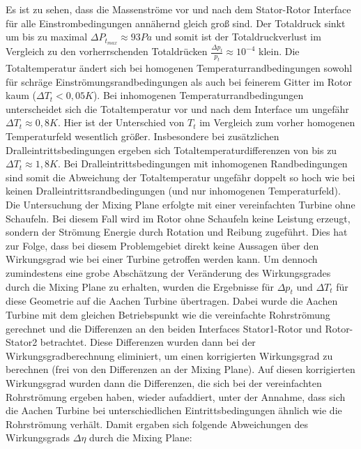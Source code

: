 Es ist zu sehen, dass die Massenströme vor und nach dem Stator-Rotor Interface für alle Einstrombedingungen annähernd gleich groß sind. Der Totaldruck sinkt um bis zu maximal $\Delta P_{t_{max}} \approx 93 Pa$ und somit ist der Totaldruckverlust im Vergleich zu den vorherrschenden Totaldrücken $\frac{\Delta p_t}{p_t} \approx 10^{-4}$ klein. \newline Die Totaltemperatur ändert sich bei homogenen Temperaturrandbedingungen sowohl für schräge Einströmungsrandbedingungen als auch bei feinerem Gitter im Rotor kaum ($\Delta T_t < 0,05 K$). \newline
Bei inhomogenen Temperaturrandbedingungen unterscheidet sich die Totaltemperatur vor und nach dem Interface um ungefähr $\Delta T_t \approx 0,8K$. Hier ist der Unterschied von $T_t$ im Vergleich zum vorher homogenen Temperaturfeld wesentlich größer. Insbesondere bei zusätzlichen Dralleintrittsbedingungen ergeben sich Totaltemperaturdifferenzen von bis zu $\Delta T_t \approx 1,8K$. Bei Dralleintrittsbedingungen mit inhomogenen Randbedingungen sind somit die Abweichung der Totaltemperatur ungefähr doppelt so hoch wie bei keinen Dralleintrittsrandbedingungen (und nur inhomogenen Temperaturfeld).\\
Die Untersuchung der Mixing Plane erfolgte mit einer vereinfachten Turbine ohne Schaufeln. Bei diesem Fall wird im Rotor ohne Schaufeln keine Leistung erzeugt, sondern der Strömung Energie durch Rotation und Reibung zugeführt. Dies hat zur Folge, dass bei diesem Problemgebiet direkt keine Aussagen über den Wirkungsgrad wie bei einer Turbine getroffen werden kann. Um dennoch zumindestens eine grobe Abschätzung der Veränderung des Wirkungsgrades durch die Mixing Plane zu erhalten, wurden die Ergebnisse für $\Delta p_t$ und $\Delta T_t$ für diese Geometrie auf die Aachen Turbine übertragen. Dabei wurde die Aachen Turbine mit dem gleichen Betriebspunkt wie die vereinfachte Rohrströmung gerechnet und die Differenzen an den beiden Interfaces Stator1-Rotor und Rotor-Stator2 betrachtet. Diese Differenzen wurden dann bei der Wirkungsgradberechnung eliminiert, um einen korrigierten Wirkungsgrad zu berechnen (frei von den Differenzen an der Mixing Plane). Auf diesen korrigierten Wirkungsgrad wurden dann die Differenzen, die sich bei der vereinfachten Rohrströmung ergeben haben, wieder aufaddiert, unter der Annahme, dass sich die Aachen Turbine bei unterschiedlichen Eintrittsbedingungen ähnlich wie die Rohrströmung verhält. Damit ergaben sich folgende Abweichungen des Wirkungsgrads $\Delta \eta$ durch die Mixing Plane:
